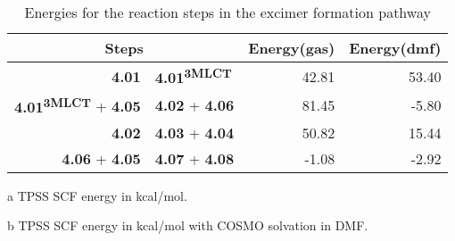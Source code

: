 \begin{table}[!htb]
\centering
 \begin{threeparttable}
  \caption{Energies for the reaction steps in the excimer formation pathway}
    \begin{tabular}{r@{ $\rightarrow$ }lrr}
    \toprule
    \multicolumn{2}{c}{Steps} & Energy(gas)\tnote{a} & Energy(dmf)\tnote{b} \\
    \midrule
    \textbf{4.01} & \textbf{4.01\textsuperscript{3MLCT}} & 42.81 & 53.40 \\
    \textbf{4.01\textsuperscript{3MLCT}} + \textbf{4.05} & \textbf{4.02} + \textbf{4.06} & 81.45 & -5.80 \\
    \textbf{4.02} & \textbf{4.03} + \textbf{4.04} & 50.82 & 15.44 \\
    \textbf{4.06} + \textbf{4.05} & \textbf{4.07} + \textbf{4.08} & -1.08 & -2.92 \\
    \bottomrule
    \end{tabular}%
    \begin{tablenotes}
    \item [a] TPSS SCF energy in kcal/mol.
    \item [b] TPSS SCF energy in kcal/mol with COSMO solvation in DMF.
    \end{tablenotes}
  \label{tab.suprxn}%
 \end{threeparttable}
\end{table}%



